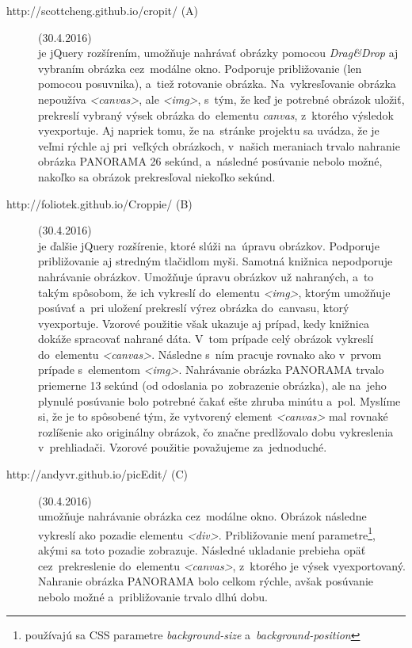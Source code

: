 \begin{description}
	
	\item[http://scottcheng.github.io/cropit/ (A)] (30.4.2016)\\
	je jQuery rozšírením, umožňuje nahrávať obrázky pomocou \emph{Drag\&Drop} aj vybraním obrázka cez~modálne okno. Podporuje približovanie (len pomocou posuvnika), a~tiež rotovanie obrázka. Na~vykresľovanie obrázka nepoužíva \emph{<canvas>}, ale \emph{<img>}, s~tým, že keď je potrebné obrázok uložiť, prekreslí vybraný výsek obrázka do~elementu \emph{canvas}, z~ktorého výsledok vyexportuje. Aj napriek tomu, že na~stránke projektu sa uvádza, že je veľmi rýchle aj pri~veľkých obrázkoch, v~našich meraniach trvalo nahranie obrázka PANORAMA 26 sekúnd, a~následné posúvanie nebolo možné, nakoľko sa obrázok prekresľoval niekoľko sekúnd.
	
	
	\item[http://foliotek.github.io/Croppie/ (B)] (30.4.2016)\\
	je ďalšie jQuery rozšírenie, ktoré slúži na~úpravu obrázkov. Podporuje približovanie aj stredným tlačidlom myši. Samotná knižnica nepodporuje nahrávanie obrázkov. Umožňuje úpravu obrázkov už nahraných, a~to takým spôsobom, že ich vykreslí do~elementu \emph{<img>}, ktorým umožňuje posúvať a~pri uložení prekreslí výrez obrázka do~canvasu, ktorý vyexportuje. Vzorové použitie však ukazuje aj prípad, kedy knižnica dokáže spracovať nahrané dáta. V~tom prípade celý obrázok vykreslí do~elementu \emph{<canvas>}. Následne s~ním pracuje rovnako ako v~prvom prípade s~elementom \emph{<img>}. Nahrávanie obrázka PANORAMA trvalo priemerne 13 sekúnd (od odoslania po~zobrazenie obrázka), ale na~jeho plynulé posúvanie bolo potrebné čakať ešte zhruba minútu a~pol. Myslíme si, že je to spôsobené tým, že vytvorený element \emph{<canvas>} mal rovnaké rozlíšenie ako originálny obrázok, čo značne predlžovalo dobu vykreslenia v~prehliadači. Vzorové použitie považujeme za~jednoduché.
	
	
	\item[http://andyvr.github.io/picEdit/ (C)] (30.4.2016)\\
	umožňuje nahrávanie obrázka cez~modálne okno. Obrázok následne vykreslí ako pozadie elementu \emph{<div>}. Približovanie mení parametre\footnote{používajú sa CSS parametre \emph{background-size} a~\emph{background-position}}, akými sa toto pozadie zobrazuje. Následné ukladanie prebieha opäť cez~prekreslenie do~elementu \emph{<canvas>}, z~ktorého je výsek vyexportovaný. Nahranie obrázka PANORAMA bolo celkom rýchle, avšak posúvanie nebolo možné a~približovanie trvalo dlhú dobu.
	

\end{description}
